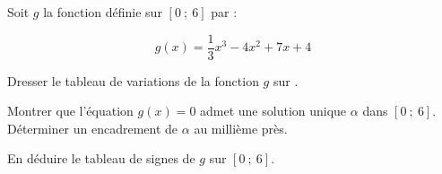\documentclass[11pt,a4paper]{article}  %
\begin{document}

Soit $g$ la fonction définie sur $[0\ ;\ 6]$ par :

$$
g(x)=\frac{1}{3} x^3-4x^2+7x+4
$$

\begin{enumMet}
	\item Dresser le tableau de variations de la fonction $g$ sur \R.
	\item Montrer que l'équation $g(x)=0$ admet une solution unique $\alpha$ dans $[0\ ;\ 6]$. Déterminer un encadrement de $\alpha$ au millième près.
	\item En déduire le tableau de signes de $g$ sur $[0\ ;\ 6]$.
\end{enumMet}
\end{document}
